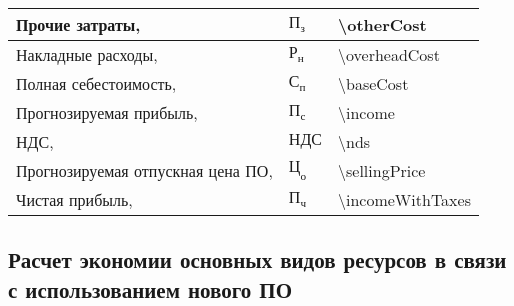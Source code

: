 \begin{table}[!h!t]
\begin{tabular}{| >{\raggedright}m{} 
                  | >{\centering}m{} 
                  | >{\centering\arraybackslash}m{}|}
    \hline
    Прочие затраты, \byr{} & $ \text{П}_\text{з} $ & \num{\otherCost} \\

    \hline
    Накладные расходы, \byr{} & $ \text{Р}_\text{н} $ & \num{\overheadCost} \\



    \hline
    Полная себестоимость, \byr{} & $ \text{С}_\text{п} $ & \num{\baseCost} \\

    \hline
    Прогнозируемая прибыль, \byr{} & $ \text{П}_\text{с} $ & \num{\income} \\

    \hline
    НДС, \byr{} & $ \text{НДС} $ & \num{\nds} \\

    \hline
    Прогнозируемая отпускная цена ПО, \byr{} & $ \text{Ц}_\text{о} $ & \num{\sellingPrice} \\

    \hline
    Чистая прибыль, \byr{} & $ \text{П}_\text{ч} $ & \num{\incomeWithTaxes} \\

    \hline
  \end{tabular}
\end{table}

\subsection{Расчет экономии основных видов ресурсов в связи с использованием нового ПО}


\FPeval{\salaryEconTaskExact}{ (\avgProgrammerSalary * (\avgWorkBefore - \avgWorkAfter)) / (\clientWorkingHoursInDay * \avgWorkingDaysInMonth) }

\FPeval{\salaryEconExact}{ \salaryEconTask * \tasksInYear }

